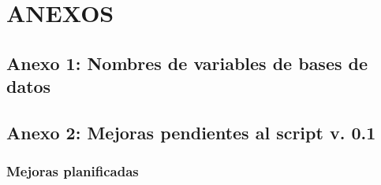 \documentclass[
  spanish,
]{book}
\begin{document}
\hypertarget{part-anexos}{%
\part*{ANEXOS}\label{part-anexos}}

\hypertarget{anexo1}{%
\chapter*{Anexo 1: Nombres de variables de bases de datos}\label{anexo1}}

\hypertarget{anexo-2-mejoras-pendientes-al-script-v.-0.1}{%
\chapter*{Anexo 2: Mejoras pendientes al script v. 0.1}\label{anexo-2-mejoras-pendientes-al-script-v.-0.1}}

\hypertarget{mejoras-planificadas}{%
\section*{Mejoras planificadas}\label{mejoras-planificadas}}
\end{document}
